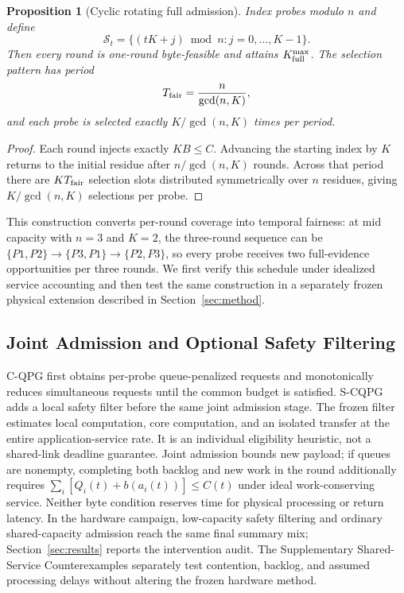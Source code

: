 \documentclass[10pt,journal]{IEEEtran}
\newtheorem{proposition}{Proposition}
\newcommand{\CQPG}{\textsc{C-QPG}}
\newcommand{\SCQPG}{\textsc{S-CQPG}}
\begin{document}
\begin{proposition}[Cyclic rotating full admission]
\label{prop:rotation}
Index probes modulo $n$ and define
\begin{equation}
\mathcal S_t=\{(tK+j)\bmod n: j=0,\ldots,K-1\}.
\label{eq:rotation}
\end{equation}
Then every round is one-round byte-feasible and attains
$K_{\rm full}^{\max}$. The selection pattern has period
\begin{equation}
T_{\rm fair}=\frac{n}{\gcd(n,K)},
\label{eq:fairperiod}
\end{equation}
and each probe is selected exactly $K/\gcd(n,K)$ times per period.
\end{proposition}
\begin{proof}
Each round injects exactly $KB\leq C$. Advancing the starting index by $K$
returns to the initial residue after $n/\gcd(n,K)$ rounds. Across that
period there are $KT_{\rm fair}$ selection slots distributed symmetrically
over $n$ residues, giving $K/\gcd(n,K)$ selections per probe.
\end{proof}

This construction converts per-round coverage into temporal fairness: at mid
capacity with $n=3$ and $K=2$, the three-round sequence can be
$\{P1,P2\}\rightarrow\{P3,P1\}\rightarrow\{P2,P3\}$, so every probe
receives two full-evidence opportunities per three rounds. We first verify
this schedule under idealized service accounting and then test the same
construction in a separately frozen physical extension described in
Section~\ref{sec:method}.

\subsection{Joint Admission and Optional Safety Filtering}
\CQPG{} first obtains per-probe queue-penalized requests and monotonically
reduces simultaneous requests until the common budget is satisfied.
\SCQPG{} adds a local safety filter before the same joint admission stage.
The frozen filter estimates local computation, core computation, and an
isolated transfer at the entire application-service rate. It is an individual
eligibility heuristic, not a shared-link deadline guarantee.
Joint admission bounds new payload; if queues are nonempty, completing both
backlog and new work in the round additionally requires
$\sum_i[Q_i(t)+b(a_i(t))]\leq C(t)$ under ideal work-conserving service.
Neither byte condition reserves time for physical processing or return
latency. In the hardware campaign, low-capacity safety filtering and ordinary shared-capacity
admission reach the same final summary mix; Section~\ref{sec:results}
reports the intervention audit. The Supplementary Shared-Service
Counterexamples separately test contention, backlog, and assumed processing
delays without altering the frozen hardware method.
\end{document}
